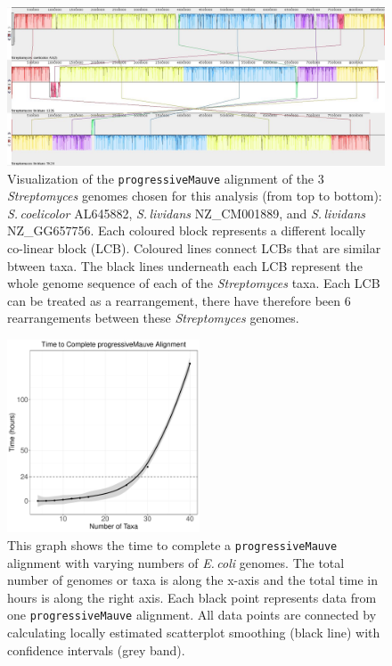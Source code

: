 \documentclass[11pt]{article}
\newcommand{\strep}{\textit{Streptomyces}\xspace}
\newcommand{\ecol}{\textit{E.\,coli}\xspace}
\newcommand{\p}{\texttt{progressiveMauve}\xspace}
\newcommand{\sliv}{\textit{S.\,lividans}\xspace}
\newcommand{\scoe}{\textit{S.\,coelicolor}\xspace}
\begin{document}
	\begin{figure}[H]
	\begin{center}
		\includegraphics[width=\textwidth]{./figs/3_strep_strains_mauve_aln_pic}
		\caption{\label{fig:strep3mauvealn} Visualization of the \p alignment of the 3 \strep genomes chosen for this analysis (from top to bottom): \scoe AL645882, \sliv NZ\_CM001889, and \sliv NZ\_GG657756. Each coloured block represents a different locally co-linear block (LCB). Coloured lines connect LCBs that are similar btween taxa. The black lines underneath each LCB represent the whole genome sequence of each of the \strep taxa. Each LCB can be treated as a rearrangement, there have therefore been 6 rearrangements between these \strep genomes.}
	\end{center}
\end{figure}
	
	\begin{figure}[H]
	\begin{center}
		\includegraphics[width=0.51\textwidth]{./figs/mauve_time_plot}
		\caption{\label{fig:mauvetimeplot} This graph shows the time to complete a \p alignment with varying numbers of \ecol genomes. The total number of genomes or taxa is along the x-axis and the total time in hours is along the right axis. Each black point represents data from one \p alignment. All data points are connected by calculating locally estimated scatterplot smoothing (black line) with confidence intervals (grey band).}
	\end{center}
\end{figure}
	
\end{document}
